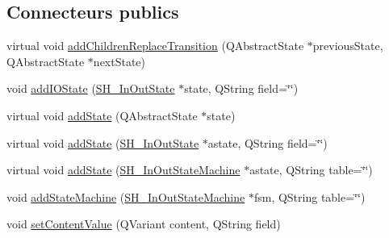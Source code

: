 \subsection*{Connecteurs publics}
\begin{DoxyCompactItemize}
\item 
virtual void \hyperlink{classSH__InOutStateMachine_ae0f3b4622d2c70884bb224dee86e95c0}{add\-Children\-Replace\-Transition} (Q\-Abstract\-State $\ast$previous\-State, Q\-Abstract\-State $\ast$next\-State)
\item 
void \hyperlink{classSH__InOutStateMachine_ab6e90f9e187ab70d51ed4e3e1f69f912}{add\-I\-O\-State} (\hyperlink{classSH__InOutState}{S\-H\-\_\-\-In\-Out\-State} $\ast$state, Q\-String field=\char`\"{}\char`\"{})
\item 
virtual void \hyperlink{classSH__InOutStateMachine_a3de9dedcdfd6efab868484c047638f71}{add\-State} (Q\-Abstract\-State $\ast$state)
\item 
virtual void \hyperlink{classSH__InOutStateMachine_a52469f4988c3eb654def2ed237fd10eb}{add\-State} (\hyperlink{classSH__InOutState}{S\-H\-\_\-\-In\-Out\-State} $\ast$astate, Q\-String field=\char`\"{}\char`\"{})
\item 
virtual void \hyperlink{classSH__InOutStateMachine_adcd6eb72b60b2c24aa6701977b5c7c1e}{add\-State} (\hyperlink{classSH__InOutStateMachine}{S\-H\-\_\-\-In\-Out\-State\-Machine} $\ast$astate, Q\-String table=\char`\"{}\char`\"{})
\item 
void \hyperlink{classSH__InOutStateMachine_a0814df2e3f2b776ba210f98cd05be70d}{add\-State\-Machine} (\hyperlink{classSH__InOutStateMachine}{S\-H\-\_\-\-In\-Out\-State\-Machine} $\ast$fsm, Q\-String table=\char`\"{}\char`\"{})
\item 
void \hyperlink{classSH__InOutStateMachine_a9ab1534306b2bdb62743d4bcefe40c17}{set\-Content\-Value} (Q\-Variant content, Q\-String field)
\end{DoxyCompactItemize}
